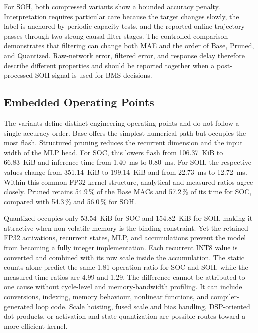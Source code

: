 \documentclass[
    a4paper,
    12pt,
    titlepage,
    bibliography=totoc,
    twoside=on,
    parskip=false,
    numbers=noenddot,
    cleardoublepage=empty,
    DIV=12,
    BCOR=12.0mm,
    headheight=36pt,
    headings=openright
]{scrreprt}
\begin{document}
For SOH, both compressed variants show a bounded accuracy penalty. Interpretation requires particular care because the target changes slowly, the label is anchored by periodic capacity tests, and the reported online trajectory passes through two strong causal filter stages. The controlled comparison demonstrates that filtering can change both MAE and the order of Base, Pruned, and Quantized. Raw-network error, filtered error, and response delay therefore describe different properties and should be reported together when a post-processed SOH signal is used for BMS decisions.

\subsection{Embedded Operating Points}
The variants define distinct engineering operating points and do not follow a single accuracy order. Base offers the simplest numerical path but occupies the most flash. Structured pruning reduces the recurrent dimension and the input width of the MLP head. For SOC, this lowers flash from 106.37~KiB to 66.83~KiB and inference time from \SI{1.40}{\milli\second} to \SI{0.80}{\milli\second}. For SOH, the respective values change from 351.14~KiB to 199.14~KiB and from \SI{22.73}{\milli\second} to \SI{12.72}{\milli\second}. Within this common FP32 kernel structure, analytical and measured ratios agree closely. Pruned retains 54.9\,\% of the Base MACs and 57.2\,\% of its time for SOC, compared with 54.3\,\% and 56.0\,\% for SOH.

Quantized occupies only 53.54~KiB for SOC and 154.82~KiB for SOH, making it attractive when non-volatile memory is the binding constraint. Yet the retained FP32 activations, recurrent states, MLP, and accumulations prevent the model from becoming a fully integer implementation. Each recurrent INT8 value is converted and combined with its row scale inside the accumulation. The static counts alone predict the same 1.81 operation ratio for SOC and SOH, while the measured time ratios are 4.99 and 1.29. The difference cannot be attributed to one cause without cycle-level and memory-bandwidth profiling. It can include conversions, indexing, memory behaviour, nonlinear functions, and compiler-generated loop code. Scale hoisting, fused scale and bias handling, DSP-oriented dot products, or activation and state quantization are possible routes toward a more efficient kernel.
\end{document}
